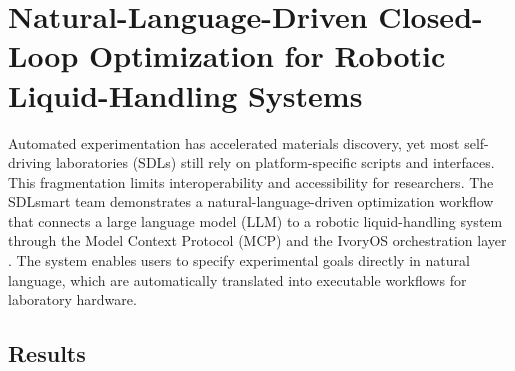\section{Natural-Language-Driven Closed-Loop Optimization for Robotic Liquid-Handling Systems}




Automated experimentation has accelerated materials discovery, yet most self-driving laboratories (SDLs) still rely on platform-specific scripts and interfaces. This fragmentation limits interoperability and accessibility for researchers.  
The SDLsmart team demonstrates a natural-language-driven optimization workflow that connects a large language model (LLM) to a robotic liquid-handling system through the Model Context Protocol (MCP) and the IvoryOS orchestration layer \cite{mcp2024, zhang_ivoryos_2025}. The system enables users to specify experimental goals directly in natural language, which are automatically translated into executable workflows for laboratory hardware.


\subsection*{Results}

